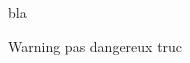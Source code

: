 
\begin{DoxyRefList}
\item[\label{bug__bug000001}%
\hypertarget{bug__bug000001}{}%
Class \hyperlink{class_b___movable}{B\+\_\+\+Movable} ]bla \begin{DoxyWarning}{Warning}
pas dangereux truc 
\end{DoxyWarning}

\end{DoxyRefList}